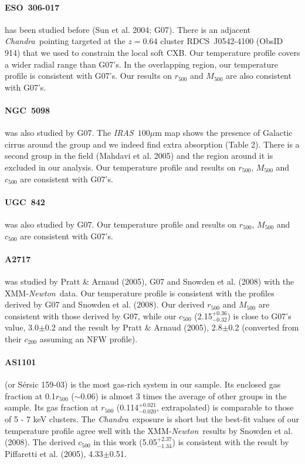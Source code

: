 \documentclass{aastex}
\def\chandra    {{\em Chandra}\/}
\def\xmm        {XMM-{\em Newton}\/}
\def\iras        {{\em IRAS}\/}
\begin{document}
\begin{appendix}
\paragraph{ESO~306-017} has been studied before (Sun et al. 2004; G07).
There is an adjacent \chandra\ pointing targeted at the $z=0.64$ cluster
RDCS~J0542-4100 (ObsID 914) that we used to constrain the local soft CXB.
Our temperature profile covers a wider radial range than G07's. In the overlapping
region, our temperature profile is consistent with G07's. Our results on $r_{500}$
and $M_{500}$ are also consistent with G07's.

\paragraph{NGC~5098} was also studied by G07. The \iras\ $100\mu$m map shows the
presence of Galactic cirrus around the group and we indeed find extra absorption
(Table 2). There is a second group in the field (Mahdavi et al. 2005) and the
region around it is excluded in our analysis. Our temperature profile and
results on $r_{500}$, $M_{500}$ and $c_{500}$ are consistent with G07's.

\paragraph{UGC~842} was also studied by G07. Our temperature profile and
results on $r_{500}$, $M_{500}$ and $c_{500}$ are consistent with G07's.

\paragraph{A2717} was studied by Pratt \& Arnaud (2005), G07 and Snowden et al. (2008)
with the \xmm\ data. Our temperature profile is consistent with the profiles
derived by G07 and Snowden et al. (2008).
Our derived $r_{500}$ and $M_{500}$ are consistent with
those derived by G07, while our $c_{500}$ (2.15$^{+0.36}_{-0.32}$) is close to G07's value,
3.0$\pm$0.2 and the result by Pratt \& Arnaud (2005), 2.8$\pm$0.2 (converted from
their $c_{200}$ assuming an NFW profile).

\paragraph{AS1101} (or S\'{e}rsic 159-03) is the most gas-rich system in our sample.
Its enclosed gas
fraction at 0.1$r_{500}$ ($\sim$0.06) is almost 3 times the average of other groups
in the sample. Its gas fraction at $r_{500}$ (0.114$^{+0.021}_{-0.020}$, extrapolated)
is comparable to those of 5 - 7 keV clusters. The \chandra\
exposure is short but the best-fit values of our temperature profile
agree well with the \xmm\ results by Snowden et al. (2008).
The derived $c_{500}$ in this work (5.05$^{+2.37}_{-1.34}$) is consistent with
the result by Piffaretti et al. (2005), 4.33$\pm$0.51.


\end{appendix}
\end{document}
